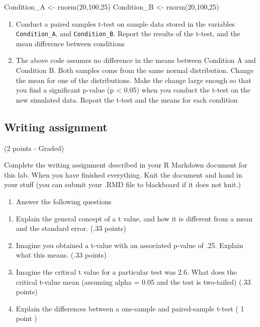 \documentclass[
]{book}
\newenvironment{Shaded}{\begin{snugshade}}{\end{snugshade}}
\newcommand{\DecValTok}[1]{\textcolor[rgb]{0.00,0.00,0.81}{#1}}
\newcommand{\FunctionTok}[1]{\textcolor[rgb]{0.00,0.00,0.00}{#1}}
\newcommand{\NormalTok}[1]{#1}
\newcommand{\OtherTok}[1]{\textcolor[rgb]{0.56,0.35,0.01}{#1}}
\providecommand{\tightlist}{%
  \setlength{\itemsep}{0pt}\setlength{\parskip}{0pt}}
\begin{document}
\begin{Shaded}
\begin{Highlighting}[]
\NormalTok{Condition\_A }\OtherTok{\textless{}{-}} \FunctionTok{rnorm}\NormalTok{(}\DecValTok{20}\NormalTok{,}\DecValTok{100}\NormalTok{,}\DecValTok{25}\NormalTok{)}
\NormalTok{Condition\_B }\OtherTok{\textless{}{-}} \FunctionTok{rnorm}\NormalTok{(}\DecValTok{20}\NormalTok{,}\DecValTok{100}\NormalTok{,}\DecValTok{25}\NormalTok{)}
\end{Highlighting}
\end{Shaded}

\begin{enumerate}
\def\labelenumi{\arabic{enumi}.}
\item
  Conduct a paired samples t-test on sample data stored in the variables \texttt{Condition\_A}, and \texttt{Condition\_B}. Report the results of the t-test, and the mean difference between conditions
\item
  The above code assumes no difference in the means between Condition A and Condition B. Both samples come from the same normal distribution. Change the mean for one of the distributions. Make the change large enough so that you find a significant p-value (p \textless{} 0.05) when you conduct the t-test on the new simulated data. Report the t-test and the means for each condition
\end{enumerate}

\hypertarget{writing-assignment-5}{%
\subsection{Writing assignment}\label{writing-assignment-5}}

(2 points - Graded)

Complete the writing assignment described in your R Markdown document for this lab. When you have finished everything. Knit the document and hand in your stuff (you can submit your .RMD file to blackboard if it does not knit.)

\begin{enumerate}
\def\labelenumi{\arabic{enumi}.}
\tightlist
\item
  Answer the following questions
\end{enumerate}

\begin{enumerate}
\def\labelenumi{\alph{enumi}.}
\item
  Explain the general concept of a t value, and how it is different from a mean and the standard error. (.33 points)
\item
  Imagine you obtained a t-value with an associated p-value of .25. Explain what this means. (.33 points)
\item
  Imagine the critical t value for a particular test was 2.6. What does the critical t-value mean (assuming alpha = 0.05 and the test is two-tailed) (.33 points)
\item
  Explain the differences between a one-sample and paired-sample t-test ( 1 point )
\end{enumerate}
\end{document}

